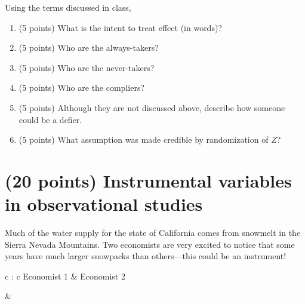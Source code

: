 \documentclass[10pt]{article}
\begin{document}
Using the terms discussed in class,

\begin{enumerate}
\item (5 points) What is the intent to treat effect (in words)?
\item (5 points) Who are the always-takers?
\item (5 points) Who are the never-takers?
\item (5 points) Who are the compliers?
\item (5 points) Although they are not discussed above, describe how someone could be a defier.
\item (5 points) What assumption was made credible by randomization of $Z$?
\end{enumerate}

\section{(20 points) Instrumental variables in observational studies}

Much of the water supply for the state of California comes from snowmelt in the Sierra Nevada Mountains. Two economists are very excited to notice that some years have much larger snowpacks than others---this could be an instrument!

\begin{table}[!ht]
\centering
\begin{tabular}{c : c}
  Economist 1 & Economist 2 \\
  \hline
   &
\end{tabular}
\end{table}
\end{document}
